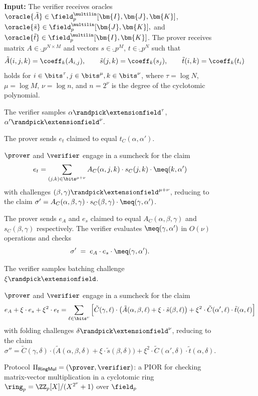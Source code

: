 \begin{figure}[H]
\caption{Protocol $\Pi_{\mathsf{RingMul}}=(\prover, \verifier)$: a PIOR for checking matrix-vector multiplication in a cyclotomic ring $\ring_p = \ZZ_p[X]/(X^{2^\nu}+1)$ over $\field_p$}
\label{prot:ringmul}
\begin{algorithm}[H]
\textbf{Input:} The verifier receives oracles $\oracle{\tilde{A}} \in \field_{p}^{\multilin}[\bm{I},\bm{J},\bm{K}]$, $\oracle{\tilde{s}} \in \field_{p}^{\multilin}[\bm{J},\bm{K}],$ and $\oracle{\tilde{t}} \in \field_{p}^{\multilin}[\bm{I},\bm{K}]$. The prover receives matrix $A \in \ring_{p}^{N\times M}$ and vectors $s \in \ring_{p}^{M}$, $t \in \ring_{p}^{N}$ such that
\[
    \tilde{A}(i,j,k) = \coeff_k(A_{i,j}), \qquad
    \tilde{s}(j,k) = \coeff_k(s_j), \qquad
    \tilde{t}(i,k) = \coeff_k(t_i)
\]
holds for $i \in \bits^\tau, j \in \bits^\mu, k \in \bits^\nu$, where $\tau = \log N$, $\mu = \log M$, $\nu = \log n$, and $n = 2^\nu$ is the degree of the cyclotomic polynomial.

\begin{algorithmic}[1]
    \STATE The verifier samples $\alpha \randpick \extensionfield^{\tau}$, $\alpha' \randpick \extensionfield^{\nu}$.

    \STATE The prover sends $e_t$ claimed to equal $t_C(\alpha, \alpha')$.

    \STATE $\prover$ and $\verifier$ engage in a sumcheck for the claim
    \[
        e_t = \sum_{(j,k) \in \bits^{\mu+\nu}} A_C(\alpha, j, k) \cdot s_C(j, k) \cdot \meq(k, \alpha')
    \]
    with challenges $(\beta,\gamma) \randpick \extensionfield^{\mu+\nu}$, reducing to the claim $\sigma' = A_C(\alpha, \beta, \gamma) \cdot s_C(\beta, \gamma) \cdot \meq(\gamma, \alpha')$.

    \STATE The prover sends $e_A$ and $e_s$ claimed to equal $A_C(\alpha, \beta, \gamma)$ and $s_C(\beta, \gamma)$ respectively. The verifier evaluates $\meq(\gamma,\alpha')$ in $O(\nu)$ operations and checks
    \[
        \sigma' \;=\; e_A \cdot e_s \cdot \meq(\gamma, \alpha').
    \]

    \STATE The verifier samples batching challenge $\xi \randpick \extensionfield$.

    \STATE $\prover$ and $\verifier$ engage in a sumcheck for the claim
    \[
        e_A + \xi \cdot e_s + \xi^{2} \cdot e_t  = \sum_{\ell \in \bits^{\nu}} \Big[\tilde{C}(\gamma, \ell) \cdot \big(\tilde{A}(\alpha, \beta, \ell) + \xi \cdot \tilde{s}(\beta, \ell)\big) + \xi^{2} \cdot \tilde{C}(\alpha', \ell) \cdot \tilde{t}(\alpha, \ell)\Big]
    \]
    with folding challenges $\delta \randpick \extensionfield^{\nu}$, reducing to the claim
    \[
        \sigma'' = \tilde{C}(\gamma, \delta) \cdot \big(\tilde{A}(\alpha, \beta, \delta) + \xi \cdot \tilde{s}(\beta, \delta)\big) + \xi^{2} \cdot \tilde{C}(\alpha', \delta) \cdot \tilde{t}(\alpha, \delta).
    \]


\end{algorithmic}
\end{algorithm}
\end{figure}
